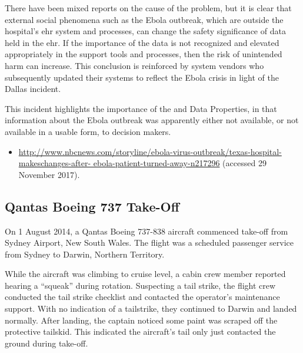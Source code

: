 There have been mixed reports on the cause of the problem, but it is clear that external social phenomena such as the Ebola outbreak, which are outside the hospital's \gls{ehr} system and processes, can change the safety significance of data held in the \gls{ehr}. If the importance of the data is not recognized and elevated appropriately in the support tools and processes, then the risk of unintended harm can increase. This conclusion is reinforced by system vendors who subsequently updated their systems to reflect the Ebola crisis in light of the Dallas incident.

This incident highlights the importance of the  and  Data Properties, in that information about the Ebola outbreak was apparently either not available, or not available in a usable form, to decision makers.

\begin{samepage}
\begin{itemize}
  \item \raggedright{\href{http://www.nbcnews.com/storyline/ebola-virus-outbreak/texas-hospital-makeschanges-after-ebola-patient-turned-away-n217296}{http://www.nbcnews.com/storyline/ebola-virus-outbreak/texas-hospital-makeschanges-after- ebola-patient-turned-away-n217296} (accessed 29 November 2017).} 
\end{itemize}
\end{samepage}


\subsection{Qantas Boeing 737 Take-Off} \label{bkm:incacc:qantastakeoff}
On 1 August 2014, a Qantas Boeing 737-838 aircraft commenced take-off from Sydney Airport, New South Wales. The flight was a scheduled passenger service from Sydney to Darwin, Northern Territory.

While the aircraft was climbing to cruise level, a cabin crew member reported hearing a ``squeak'' during rotation. Suspecting a tail strike, the flight crew conducted the tail strike checklist and contacted the operator's maintenance support. With no indication of a tailstrike, they continued to Darwin and landed normally. After landing, the captain noticed some paint was scraped off the protective tailskid. This indicated the aircraft's tail only just contacted the ground during take-off.

